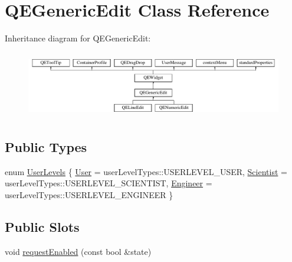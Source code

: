 \hypertarget{classQEGenericEdit}{
\section{QEGenericEdit Class Reference}
\label{classQEGenericEdit}
}
Inheritance diagram for QEGenericEdit:\begin{figure}[H]
\begin{center}
\leavevmode
\includegraphics[height=2.939633cm]{classQEGenericEdit}
\end{center}
\end{figure}
\subsection*{Public Types}
\begin{DoxyCompactItemize}
\item 
enum \hyperlink{classQEGenericEdit_a0d4ee4dc910113b53e1396e0736f28b7}{UserLevels} \{ \hyperlink{classQEGenericEdit_a0d4ee4dc910113b53e1396e0736f28b7a58230231609299c2f6c1cab4a7d5aedb}{User} =  userLevelTypes::USERLEVEL\_\-USER, 
\hyperlink{classQEGenericEdit_a0d4ee4dc910113b53e1396e0736f28b7ac942f3d3484a3a5bd465dcd2b3f52f19}{Scientist} =  userLevelTypes::USERLEVEL\_\-SCIENTIST, 
\hyperlink{classQEGenericEdit_a0d4ee4dc910113b53e1396e0736f28b7a17b7bf8f749cca831e3c8f05a4a519fa}{Engineer} =  userLevelTypes::USERLEVEL\_\-ENGINEER
 \}
\end{DoxyCompactItemize}
\subsection*{Public Slots}
\begin{DoxyCompactItemize}
\item 
void \hyperlink{classQEGenericEdit_a698af066af7eb1d5e5ad1bdc74c02536}{requestEnabled} (const bool \&state)
\end{DoxyCompactItemize}
